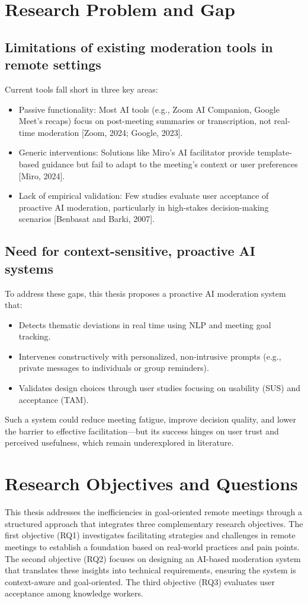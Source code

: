 \section{Research Problem and Gap}
\subsection{Limitations of existing moderation tools in remote settings}
Current tools fall short in three key areas:
\begin{itemize}
  \item Passive functionality: Most AI tools (e.g., Zoom AI Companion, Google Meet’s recaps) focus on
    post-meeting summaries or transcription, not real-time moderation [Zoom, 2024; Google, 2023].
  \item Generic interventions: Solutions like Miro’s AI facilitator provide template-based guidance but fail
    to adapt to the meeting’s context or user preferences [Miro, 2024].
  \item Lack of empirical validation: Few studies evaluate user acceptance of proactive AI moderation,
    particularly in high-stakes decision-making scenarios [Benbasat and Barki, 2007].
\end{itemize}
\subsection{Need for context-sensitive, proactive AI systems }
To address these gaps, this thesis proposes a proactive AI moderation system that:
\begin{itemize}
  \item Detects thematic deviations in real time using NLP and meeting goal tracking.
  \item Intervenes constructively with personalized, non-intrusive prompts (e.g., private messages to
    individuals or group reminders).
  \item Validates design choices through user studies focusing on usability (SUS) and acceptance (TAM).
\end{itemize}
Such a system could reduce meeting fatigue, improve decision quality, and lower the barrier to effective
facilitation—but its success hinges on user trust and perceived usefulness, which remain underexplored in literature.
\section{Research Objectives and Questions}
This thesis addresses the inefficiencies in goal-oriented remote meetings through a structured approach that
integrates three complementary research objectives. The first objective (RQ1) investigates facilitating
strategies and challenges in remote meetings to establish a foundation based on real-world practices and pain
points. The second objective (RQ2) focuses on designing an AI-based moderation system that translates these
insights into technical requirements, ensuring the system is context-aware and goal-oriented. The third
objective (RQ3) evaluates user acceptance among knowledge workers.

